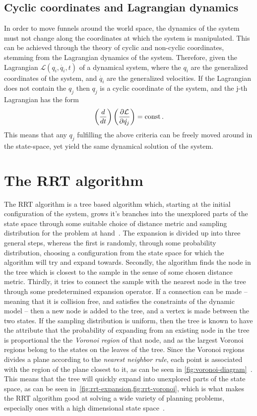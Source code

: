 \subsection{Cyclic coordinates and Lagrangian dynamics}
\label{subsec:cyclic-coordinates}

In order to move funnels around the world space, the dynamics of the system must
not change along the coordinates at which the system is manipulated. This can be
achieved through the theory of cyclic and non-cyclic coordinates, stemming from
the Lagrangian dynamics of the system. Therefore, given the Lagrangian
\(\mathcal{L}(q_i, \dot{q_i}, t)\) of a dynamical system, where the \(q_i\) are
the generalized coordinates of the system, and \(\dot{q_i}\) are the
generalized velocities. If the Lagrangian does not contain the \(q_j\) then
\(q_j\) is a cyclic coordinate of the system, and the j-th Lagrangian has the
form
\[
  \left( \frac{d}{dt} \right) \left( \frac{\partial \mathcal{L}}{\partial
      \dot{q_j}} \right) = \mathrm{const} \, .
\]
This means that any \(q_j\) fulfilling the above criteria can be freely moved
around in the state-space, yet yield the same dynamical solution of the system.

\section{The RRT algorithm}
\label{sec:rrt-algorithm-intro}

The \ac{RRT} algorithm is a tree based algorithm which, starting at the initial
configuration of the system, grows it's branches into the unexplored parts of
the state space through some suitable choice of distance metric and sampling
distribution for the problem at hand~\cite{article}. The expansion is divided up
into three general steps, whereas the first is randomly, through some
probability distribution, choosing a configuration from the state space for
which the algorithm will try and expand towards. Secondly, the algorithm finds
the node in the tree which is closest to the sample in the sense of some chosen
distance metric. Thirdly, it tries to connect the sample with the nearest node
in the tree through some predetermined expansion operator. If a connection can
be made -- meaning that it is collision free, and satisfies the constraints of
the dynamic model -- then a new node is added to the tree, and a vertex is made
between the two states. If the sampling distribution is uniform, then the tree
is known to have the attribute that the probability of expanding from an
existing node in the tree is proportional the the \textit{Voronoi region} of
that node, and as the largest Voronoi regions belong to the states on the leaves
of the tree. Since the Voronoi regions divides a plane according to the
\textit{nearest neighbor rule}, each point is associated with the region of the
plane closest to it, as can be seen in
\cref{fig:voronoi-diagram}~\cite{aurenhammerVoronoiDiagramsSurvey1991}. This
means that the tree will quickly expand into unexplored parts of the state
space, as can be seen in~\cref{fig:rrt-expansion,fig:rrt-voronoi}, which is what
makes the \ac{RRT} algorithm good at solving a wide variety of planning
problems, especially ones with a high dimensional state space~\cite{Lav06}.

